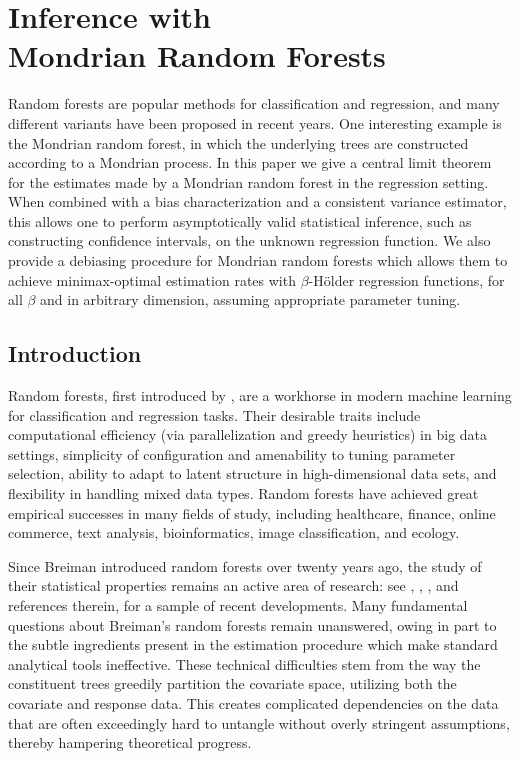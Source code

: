 
\chapter[Inference with Mondrian Random Forests]%
{Inference with \\ Mondrian Random Forests}
\label{ch:mondrian}

Random forests are popular methods for classification and regression, and many
different variants have been proposed in recent years. One interesting example
is the Mondrian random forest, in which the underlying trees are constructed
according to a Mondrian process. In this paper we give a central limit theorem
for the estimates made by a Mondrian random forest in the regression setting.
When combined with a bias characterization and a consistent variance estimator,
this allows one to perform asymptotically valid statistical inference, such as
constructing confidence intervals, on the unknown regression function. We also
provide a debiasing procedure for Mondrian random forests which allows them to
achieve minimax-optimal estimation rates with $\beta$-H{\"o}lder regression
functions, for all $\beta$ and in arbitrary dimension, assuming appropriate
parameter tuning.

\section{Introduction}

Random forests, first introduced by \citet{breiman2001random}, are a workhorse
in modern machine learning for classification and regression tasks.
Their desirable traits include computational efficiency (via parallelization
and greedy heuristics) in big data settings, simplicity of configuration and
amenability to tuning parameter selection, ability to adapt to latent structure
in high-dimensional data sets, and flexibility in handling mixed data types.
Random forests have achieved great empirical successes in many fields of study,
including healthcare, finance, online commerce, text analysis, bioinformatics,
image classification, and ecology.

Since Breiman introduced random forests over twenty years ago, the study of
their statistical properties remains an active area of research: see
\citet{Scornet-Biau-Vert_2015_AOS}, \citet{Chi-Vossler-Fan-Lv_2022_AOS},
\citet{klusowski2021universal}, and references therein, for a sample of recent
developments. Many fundamental questions about Breiman's random forests remain
unanswered, owing in part to the subtle ingredients present in the estimation
procedure which make standard analytical tools ineffective. These technical
difficulties stem from the way the constituent trees greedily partition the
covariate space, utilizing both the covariate and response data. This creates
complicated dependencies on the data that are often exceedingly hard to
untangle without overly stringent assumptions, thereby hampering theoretical
progress.

